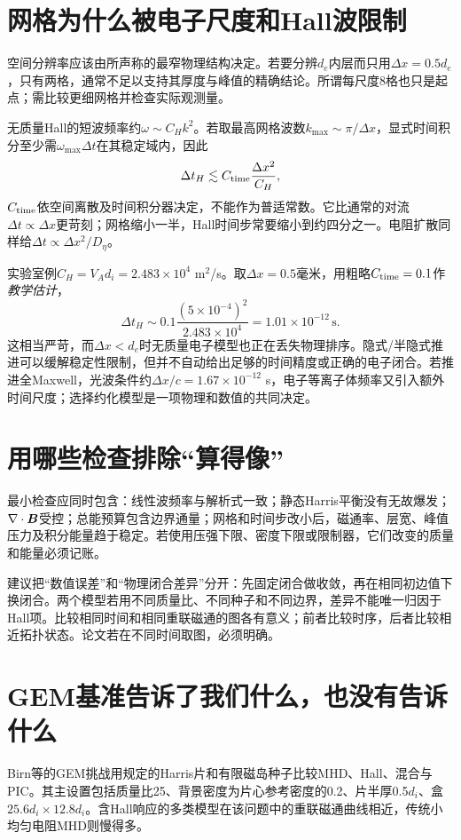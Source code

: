 \section{网格为什么被电子尺度和Hall波限制}
空间分辨率应该由所声称的最窄物理结构决定。若要分辨$d_e$内层而只用$\Delta x=0.5d_e$，只有两格，通常不足以支持其厚度与峰值的精确结论。所谓每尺度8格也只是起点；需比较更细网格并检查实际观测量。

无质量Hall的短波频率约$\omega\sim C_Hk^2$。若取最高网格波数$k_{\max}\sim\pi/\Delta x$，显式时间积分至少需$\omega_{\max}\Delta t$在其稳定域内，因此
\begin{equation}\Delta t_H\lesssim C_{\rm time}\frac{\Delta x^2}{C_H},\end{equation}
$C_{\rm time}$依空间离散及时间积分器决定，不能作为普适常数。它比通常的对流$\Delta t\propto\Delta x$更苛刻；网格缩小一半，Hall时间步常要缩小到约四分之一。电阻扩散同样给$\Delta t\propto\Delta x^2/D_\eta$。

实验室例$C_H=V_Ad_i=2.483\times10^4$ m$^2$/s。取$\Delta x=0.5$毫米，用粗略$C_{\rm time}=0.1$作\emph{教学估计}，
\begin{equation}\Delta t_H\sim0.1\frac{(5\times10^{-4})^2}{2.483\times10^4}=1.01\times10^{-12}\,\mathrm s.\end{equation}
这相当严苛，而$\Delta x<d_e$时无质量电子模型也正在丢失物理排序。隐式/半隐式推进可以缓解稳定性限制，但并不自动给出足够的时间精度或正确的电子闭合。若推进全Maxwell，光波条件约$\Delta x/c=1.67\times10^{-12}$ s，电子等离子体频率又引入额外时间尺度；选择约化模型是一项物理和数值的共同决定。

\section{用哪些检查排除“算得像”}
最小检查应同时包含：线性波频率与解析式一致；静态Harris平衡没有无故爆发；$\nabla\cdot\bm{B}$受控；总能预算包含边界通量；网格和时间步改小后，磁通率、层宽、峰值压力及积分能量趋于稳定。若使用压强下限、密度下限或限制器，它们改变的质量和能量必须记账。

建议把“数值误差”和“物理闭合差异”分开：先固定闭合做收敛，再在相同初边值下换闭合。两个模型若用不同质量比、不同种子和不同边界，差异不能唯一归因于Hall项。比较相同时间和相同重联磁通的图各有意义；前者比较时序，后者比较相近拓扑状态。论文若在不同时间取图，必须明确。

\section{GEM基准告诉了我们什么，也没有告诉什么}
Birn等的GEM挑战用规定的Harris片和有限磁岛种子比较MHD、Hall、混合与PIC。其主设置包括质量比25、背景密度为片心参考密度的0.2、片半厚0.5$d_i$、盒$25.6d_i\times12.8d_i$。含Hall响应的多类模型在该问题中的重联磁通曲线相近，传统小均匀电阻MHD则慢得多。\citep{Birn2001}

